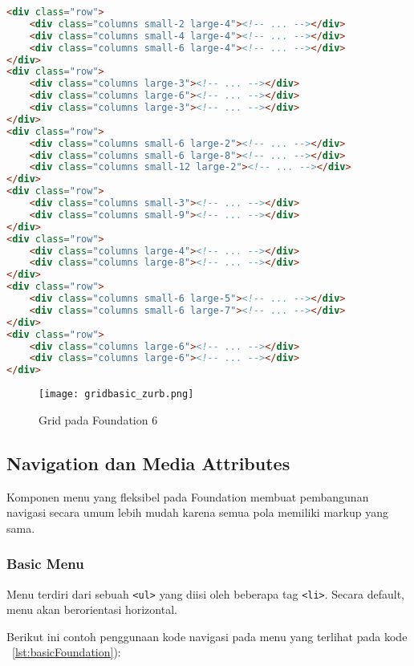 \begin{lstlisting}[style=customhtml, language=HTML,  basicstyle=\ttfamily, frame=single, columns=fullflexible, keepspaces=true, breaklines=true, showstringspaces=false, label={lst:gridFoundation}, caption=Struktur Grid Foundation 6.] 
<div class="row">
	<div class="columns small-2 large-4"><!-- ... --></div>
	<div class="columns small-4 large-4"><!-- ... --></div>
	<div class="columns small-6 large-4"><!-- ... --></div>
</div>
<div class="row">
	<div class="columns large-3"><!-- ... --></div>
	<div class="columns large-6"><!-- ... --></div>
	<div class="columns large-3"><!-- ... --></div>
</div>
<div class="row">
	<div class="columns small-6 large-2"><!-- ... --></div>
	<div class="columns small-6 large-8"><!-- ... --></div>
	<div class="columns small-12 large-2"><!-- ... --></div>
</div>
<div class="row">
	<div class="columns small-3"><!-- ... --></div>
	<div class="columns small-9"><!-- ... --></div>
</div>
<div class="row">
	<div class="columns large-4"><!-- ... --></div>
	<div class="columns large-8"><!-- ... --></div>
</div>
<div class="row">
	<div class="columns small-6 large-5"><!-- ... --></div>
	<div class="columns small-6 large-7"><!-- ... --></div>
</div>
<div class="row">
	<div class="columns large-6"><!-- ... --></div>
	<div class="columns large-6"><!-- ... --></div>
</div>
\end{lstlisting}

\begin{figure} [H]
	\centering  
	\texttt{[image: gridbasic\_zurb.png]}  
	\caption{Grid pada Foundation 6}
	\label{fig:gridFoundation}	 
\end{figure}

\subsection{Navigation dan Media Attributes}
Komponen menu yang fleksibel pada Foundation membuat pembangunan navigasi secara umum lebih mudah karena semua pola memiliki markup yang sama.

\subsubsection{Basic Menu}
Menu terdiri dari sebuah \texttt{<ul>} yang diisi oleh beberapa tag \texttt{<li>}. Secara default, menu akan berorientasi horizontal.

Berikut ini contoh penggunaan kode navigasi pada menu yang terlihat pada kode ~\ref{lst:basicFoundation}):

